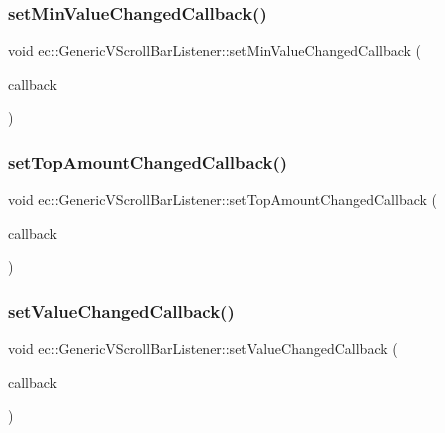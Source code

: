 \subsubsection{\texorpdfstring{set\+Min\+Value\+Changed\+Callback()}{setMinValueChangedCallback()}}
{\footnotesize\ttfamily void ec\+::\+Generic\+V\+Scroll\+Bar\+Listener\+::set\+Min\+Value\+Changed\+Callback (\begin{DoxyParamCaption}\item[{const \mbox{\hyperlink{classec_1_1_generic_v_scroll_bar_listener_ad88274a7e9cf15ea8ff56b5cffed71b2}{Min\+Value\+Changed\+\_\+\+Callback}} \&}]{callback }\end{DoxyParamCaption})}

\mbox{\label{classec_1_1_generic_v_scroll_bar_listener_ae6da4d146c94fff957d01206d6ebb99d}} 
\subsubsection{\texorpdfstring{set\+Top\+Amount\+Changed\+Callback()}{setTopAmountChangedCallback()}}
{\footnotesize\ttfamily void ec\+::\+Generic\+V\+Scroll\+Bar\+Listener\+::set\+Top\+Amount\+Changed\+Callback (\begin{DoxyParamCaption}\item[{const \mbox{\hyperlink{classec_1_1_generic_v_scroll_bar_listener_af8bcd97ac937ea6fb151d93a419cd3a2}{Top\+Amount\+Changed\+\_\+\+Callback}} \&}]{callback }\end{DoxyParamCaption})}

\mbox{\label{classec_1_1_generic_v_scroll_bar_listener_a8bb959e995ce5e1c7655ca33d7878845}} 
\subsubsection{\texorpdfstring{set\+Value\+Changed\+Callback()}{setValueChangedCallback()}}
{\footnotesize\ttfamily void ec\+::\+Generic\+V\+Scroll\+Bar\+Listener\+::set\+Value\+Changed\+Callback (\begin{DoxyParamCaption}\item[{const \mbox{\hyperlink{classec_1_1_generic_v_scroll_bar_listener_ae6332f8564b656388c34e02b9ee05575}{Value\+Changed\+\_\+\+Callback}} \&}]{callback }\end{DoxyParamCaption})}

